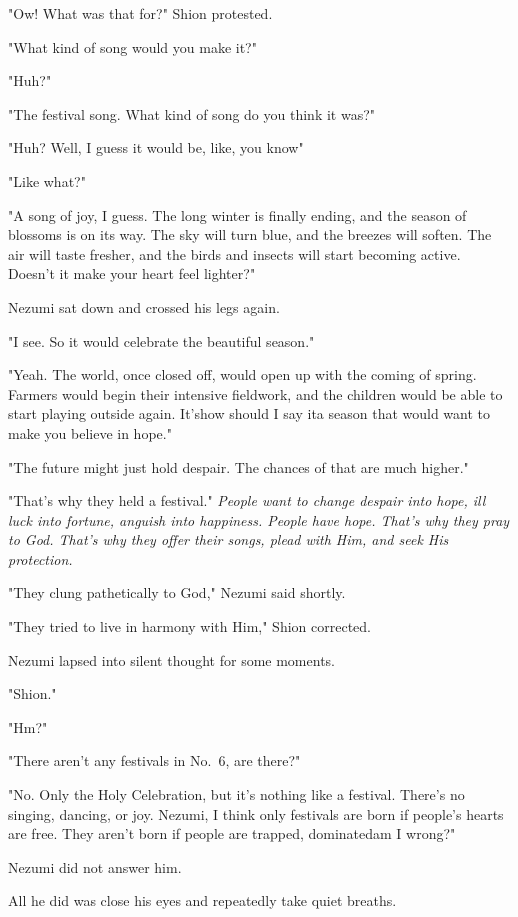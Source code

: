 "Ow! What was that for?" Shion protested.

"What kind of song would you make it?"

"Huh?"

"The festival song. What kind of song do you think it was?"

"Huh? Well, I guess it would be, like, you know\el "

"Like what?"

"\el A song of joy, I guess. The long winter is finally ending, and the season of blossoms is on its way. The sky will turn blue, and the breezes will soften. The air will taste fresher, and the birds and insects will start becoming active. Doesn't it make your heart feel lighter?"

Nezumi sat down and crossed his legs again.

"I see. So it would celebrate the beautiful season."

"Yeah. The world, once closed off, would open up with the coming of spring. Farmers would begin their intensive fieldwork, and the children would be able to start playing outside again. It's\el how should I say it\el a season that would want to make you believe in hope."

"The future might just hold despair. The chances of that are much higher."

"That's why they held a festival." \emph{People want to change despair into hope, ill luck into fortune, anguish into happiness. People have hope. That's why they pray to God. That's why they offer their songs, plead with Him, and seek His protection.}

"They clung pathetically to God," Nezumi said shortly.

"They tried to live in harmony with Him," Shion corrected.

Nezumi lapsed into silent thought for some moments.

"Shion."

"Hm?"

"There aren't any festivals in No.~6, are there?"

"No. Only the Holy Celebration, but it's nothing like a festival. There's no singing, dancing, or joy. Nezumi, I think only festivals are born if people's hearts are free. They aren't born if people are trapped, dominated\el am I wrong?"

Nezumi did not answer him.

All he did was close his eyes and repeatedly take quiet breaths.

